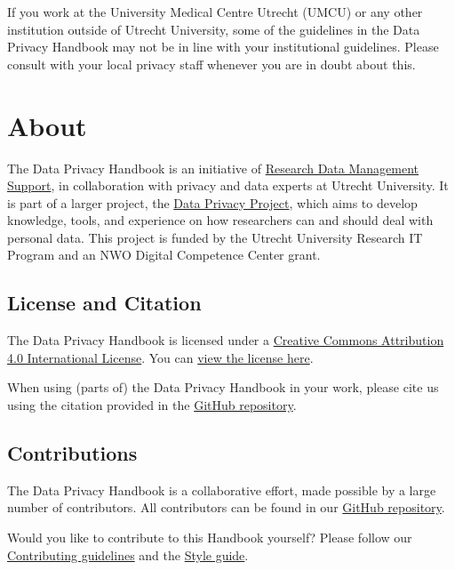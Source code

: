 \documentclass[
]{book}
\begin{document}
If you work at the University Medical Centre Utrecht (UMCU) or any other
institution outside of Utrecht University, some of the guidelines in the Data
Privacy Handbook may not be in line with your institutional guidelines. Please
consult with your local privacy staff whenever you are in doubt about this.

\hypertarget{about}{%
\section{About}\label{about}}

The Data Privacy Handbook is an initiative of
\href{https://www.uu.nl/en/research/research-data-management}{Research Data Management Support},
in collaboration with privacy and data experts at
Utrecht University. It is part of a larger project, the
\href{https://utrechtuniversity.github.io/dataprivacyproject}{Data Privacy Project},
which aims to develop knowledge, tools, and experience
on how researchers can and should deal with personal data. This project is
funded by the Utrecht University Research IT Program and an NWO Digital
Competence Center grant.

\hypertarget{license-and-citation}{%
\subsection{License and Citation}\label{license-and-citation}}

The Data Privacy Handbook is licensed under a
\href{https://creativecommons.org/licenses/by/4.0/}{Creative Commons Attribution 4.0 International License}.
You can \href{https://github.com/UtrechtUniversity/dataprivacyhandbook/blob/main/LICENSE.md}{view the license here}.

When using (parts of) the Data Privacy Handbook in your work, please cite us
using the citation provided in the \href{target=\%22_blank\%22}{GitHub repository}.

\hypertarget{contributions}{%
\subsection{Contributions}\label{contributions}}

The Data Privacy Handbook is a collaborative effort, made possible by a large
number of contributors. All contributors can be found in our
\href{https://github.com/UtrechtUniversity/dataprivacyhandbook/blob/main/contributors.md}{GitHub repository}.

Would you like to contribute to this Handbook yourself? Please follow our
\href{https://github.com/UtrechtUniversity/dataprivacyhandbook/blob/main/CONTRIBUTING.md}{Contributing guidelines}
and the \href{https://github.com/UtrechtUniversity/dataprivacyhandbook/blob/main/styleguide.md}{Style guide}.
\end{document}
